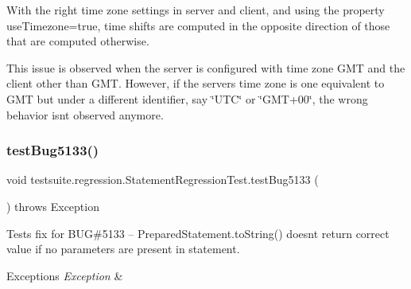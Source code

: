 With the right time zone settings in server and client, and using the property \textquotesingle{}use\+Timezone=true\textquotesingle{}, time shifts are computed in the opposite direction of those that are computed otherwise.

This issue is observed when the server is configured with time zone \textquotesingle{}G\+MT\textquotesingle{} and the client other than \textquotesingle{}G\+MT\textquotesingle{}. However, if the server\textquotesingle{}s time zone is one equivalent to \textquotesingle{}G\+MT\textquotesingle{} but under a different identifier, say \char`\"{}\+U\+T\+C\char`\"{} or \char`\"{}\+G\+M\+T+00\char`\"{}, the wrong behavior isn\textquotesingle{}t observed anymore. \mbox{\label{classtestsuite_1_1regression_1_1_statement_regression_test_aebe0b100ad408b0b92fc1c55d590e08e}} 
\subsubsection{\texorpdfstring{test\+Bug5133()}{testBug5133()}}
{\footnotesize\ttfamily void testsuite.\+regression.\+Statement\+Regression\+Test.\+test\+Bug5133 (\begin{DoxyParamCaption}{ }\end{DoxyParamCaption}) throws Exception}

Tests fix for B\+UG\#5133 -- Prepared\+Statement.\+to\+String() doesn\textquotesingle{}t return correct value if no parameters are present in statement.


\begin{DoxyExceptions}{Exceptions}
{\em Exception} & \\
\hline
\end{DoxyExceptions}
\mbox{\label{classtestsuite_1_1regression_1_1_statement_regression_test_affea712708c029d9255571ae4e846211}} 
